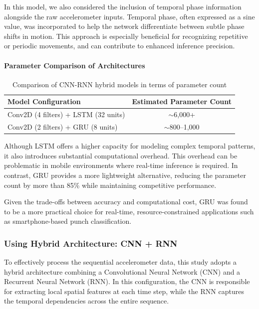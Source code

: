 \documentclass{article}
\begin{document}
In this model, we also considered the inclusion of temporal phase information alongside the raw accelerometer inputs. Temporal phase, often expressed as a sine value, was incorporated to help the network differentiate between subtle phase shifts in motion. This approach is especially beneficial for recognizing repetitive or periodic movements, and can contribute to enhanced inference precision.

\paragraph{Parameter Comparison of Architectures}

\begin{table}[h]
\centering
\begin{tabular}{|l|c|}
\hline
\textbf{Model Configuration} & \textbf{Estimated Parameter Count} \\
\hline
Conv2D (4 filters) + LSTM (32 units) & $\sim$6,000+ \\
Conv2D (2 filters) + GRU (8 units) & $\sim$800--1,000 \\
\hline
\end{tabular}
\caption{Comparison of CNN-RNN hybrid models in terms of parameter count}
\end{table}

Although LSTM offers a higher capacity for modeling complex temporal patterns, it also introduces substantial computational overhead. This overhead can be problematic in mobile environments where real-time inference is required. In contrast, GRU provides a more lightweight alternative, reducing the parameter count by more than 85\% while maintaining competitive performance.

Given the trade-offs between accuracy and computational cost, GRU was found to be a more practical choice for real-time, resource-constrained applications such as smartphone-based punch classification.

\subsubsection{Using Hybrid Architecture: CNN + RNN}

To effectively process the sequential accelerometer data, this study adopts a hybrid architecture combining a Convolutional Neural Network (CNN) and a Recurrent Neural Network (RNN). In this configuration, the CNN is responsible for extracting local spatial features at each time step, while the RNN captures the temporal dependencies across the entire sequence.
\end{document}
